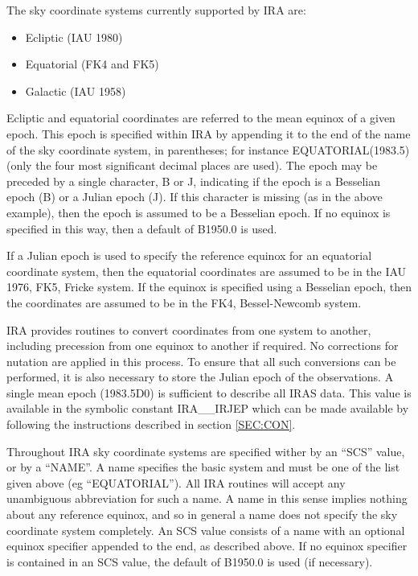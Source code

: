 The sky coordinate systems currently supported by IRA are:
\begin {itemize}
\item Ecliptic (IAU 1980)
\item Equatorial (FK4 and FK5)
\item Galactic (IAU 1958)
\end{itemize}

Ecliptic and equatorial coordinates are referred to the mean equinox of a given
epoch. This epoch is specified within IRA by appending it to the end of the name
of the sky coordinate system, in parentheses; for instance EQUATORIAL(1983.5)
(only the four most significant decimal places are used). The epoch may be
preceded by a single character, B or J, indicating if the epoch is a Besselian
epoch (B) or a Julian epoch (J). If this character is missing (as in the above
example), then the epoch is assumed to be a Besselian epoch. If no equinox is
specified in this way, then a default of B1950.0 is used.

If a Julian epoch is used to specify the reference equinox for an equatorial
coordinate system, then the equatorial coordinates are assumed to be in the
IAU 1976, FK5, Fricke system. If the equinox is specified using a Besselian
epoch, then the coordinates are assumed to be in the FK4, Bessel-Newcomb system.

IRA provides routines to convert coordinates from one system to another,
including precession from one equinox to another if required. No corrections for
nutation are applied in this process. To ensure that all such conversions can be
performed, it is also necessary to store the Julian epoch of the observations. A
single mean epoch (1983.5D0) is sufficient to describe all IRAS data. This value
is available in the symbolic constant IRA\_\_IRJEP which can be made available
by following the instructions described in section \ref {SEC:CON}.

Throughout IRA sky coordinate systems are specified wither by an ``SCS'' value,
or by a ``NAME''. A name specifies the basic system and must be one of the list
given above (eg ``EQUATORIAL''). All IRA routines will accept any unambiguous
abbreviation for such a name. A name in this sense implies nothing about any
reference equinox, and so in general a name does not specify the sky coordinate
system completely. An SCS value consists of a name with an optional equinox
specifier appended to the end, as described above. If no equinox specifier is
contained in an SCS value, the default of B1950.0 is used (if necessary).

